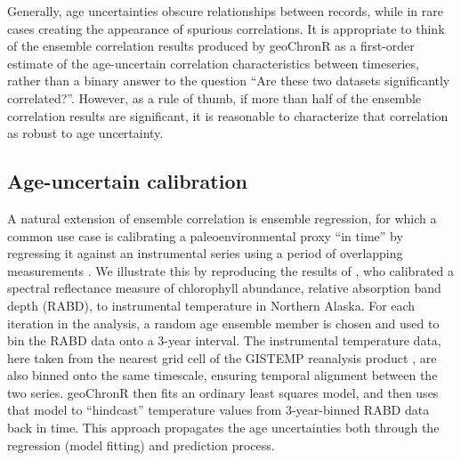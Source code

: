 \documentclass[gchron, manuscript]{copernicus}
\begin{document}
Generally, age uncertainties obscure relationships between records, while in rare cases creating the appearance of spurious correlations. It is appropriate to think of the ensemble correlation results produced by geoChronR as a first-order estimate of the age-uncertain correlation characteristics between timeseries, rather than a binary answer to the question ``Are these two datasets significantly correlated?''.
However, as a rule of thumb, if more than half of the ensemble correlation results are significant, it is reasonable to characterize that correlation as robust to age uncertainty.

\subsection{Age-uncertain calibration}

A natural extension of ensemble correlation is ensemble regression, for which a common use case is calibrating a paleoenvironmental proxy ``in time'' by regressing it against an instrumental series using a period of overlapping measurements \citep{grosjean2009calibration}.
We illustrate this by reproducing the results of \citet{Boldt2015}, who calibrated a spectral reflectance measure of chlorophyll abundance, relative absorption band depth (RABD), to instrumental temperature in Northern Alaska.
For each iteration in the analysis, a random age ensemble member is chosen and used to bin the RABD data onto a 3-year interval.
The instrumental temperature data, here taken from the nearest grid cell of the GISTEMP reanalysis product \citep{hansen2010global}, are also binned onto the same timescale, ensuring temporal alignment between the two series.
geoChronR then fits an ordinary least squares model, and then uses that model to ``hindcast'' temperature values from 3-year-binned RABD data back in time.
This approach propagates the age uncertainties both through the regression (model fitting) and prediction process.
\end{document}
